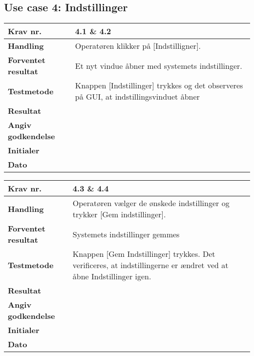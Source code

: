  \subsection{Use case 4: Indstillinger}

	\begin{center}
		\begin{longtable}{ | m{4cm}| m{8.5cm}|} 
			\hline
			\textbf{Krav nr.} & 4.1 \& 4.2  \\ 
			\hline
			\textbf{Handling} & Operatøren klikker på [Indstilligner].  \\
			\hline
			\textbf{Forventet resultat} & Et nyt vindue åbner med systemets indstillinger. \\
			\hline
			\textbf{Testmetode}  & Knappen [Indstillinger] trykkes og det observeres på GUI, at indstillingsvinduet åbner \\
			\hline
			\textbf{Resultat}  &    \\
			\hline
			\textbf{Angiv godkendelse} &     \\
			\hline
			\textbf{Initialer} &     \\
			\hline
			\textbf{Dato} &    \\
			\hline
		\end{longtable}
	\end{center}		
			
	\begin{center}
		\begin{longtable}{ | m{4cm}| m{8.5cm}|} 
			\hline
			\textbf{Krav nr.} & 4.3 \& 4.4 \\ 
			\hline
			\textbf{Handling} & Operatøren vælger de ønskede indstillinger og trykker [Gem indstillinger].  \\
			\hline
			\textbf{Forventet resultat} & Systemets indstillinger gemmes  \\
			\hline
			\textbf{Testmetode}  & Knappen [Gem Indstillinger] trykkes. Det verificeres, at indstillingerne er ændret ved at åbne Indstillinger igen.  \\
			\hline
			\textbf{Resultat}  &    \\
			\hline
			\textbf{Angiv godkendelse} &     \\
			\hline
			\textbf{Initialer} &     \\
			\hline
			\textbf{Dato} &    \\
			\hline
		\end{longtable}
	\end{center}

\newpage

